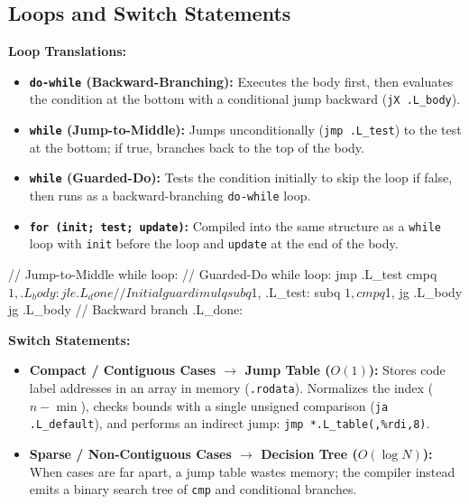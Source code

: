\subsection{Loops and Switch Statements}

\begin{definition}
    \textbf{Loop Translations:}
    \begin{itemize}
        \item \textbf{\texttt{do-while} (Backward-Branching):} Executes the body first, then evaluates the condition at the bottom with a conditional jump backward (\texttt{jX .L\_body}).
        \item \textbf{\texttt{while} (Jump-to-Middle):} Jumps unconditionally (\texttt{jmp .L\_test}) to the test at the bottom; if true, branches back to the top of the body.
        \item \textbf{\texttt{while} (Guarded-Do):} Tests the condition initially to skip the loop if false, then runs as a backward-branching \texttt{do-while} loop.
        \item \textbf{\texttt{for (init; test; update)}:} Compiled into the same structure as a \texttt{while} loop with \texttt{init} before the loop and \texttt{update} at the end of the body.
    \end{itemize}
\end{definition}

\begin{codeexample}
// Jump-to-Middle while loop:       // Guarded-Do while loop:
    jmp   .L_test                       cmpq  $1, %
.L_body:                                jle   .L_done        // Initial guard
    imulq %
    subq  $1, %
.L_test:                                subq  $1, %
    cmpq  $1, %
    jg    .L_body                       jg    .L_body        // Backward branch
                                    .L_done:
\end{codeexample}

\begin{definition}
    \textbf{Switch Statements:}
    \begin{itemize}
        \item \textbf{Compact / Contiguous Cases $\to$ Jump Table ($O(1)$):} Stores code label addresses in an array in memory (\texttt{.rodata}). Normalizes the index ($n - \min$), checks bounds with a single unsigned comparison (\texttt{ja .L\_default}), and performs an indirect jump: \texttt{jmp *.L\_table(,\%rdi,8)}.
        \item \textbf{Sparse / Non-Contiguous Cases $\to$ Decision Tree ($O(\log N)$):} When cases are far apart, a jump table wastes memory; the compiler instead emits a binary search tree of \texttt{cmp} and conditional branches.
    \end{itemize}
\end{definition}

